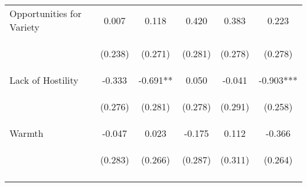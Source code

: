 \begin{tabular}{lccccc}
\noalign{\smallskip}Opportunities for Variety & 0.007 & 0.118 & 0.420 & 0.383 & 0.223\\
 & \begin{footnotesize}(0.238)\end{footnotesize} & \begin{footnotesize}(0.271)\end{footnotesize} & \begin{footnotesize}(0.281)\end{footnotesize} & \begin{footnotesize}(0.278)\end{footnotesize} & \begin{footnotesize}(0.278)\end{footnotesize}\\
\noalign{\smallskip}Lack of Hostility & -0.333 & -0.691** & 0.050 & -0.041 & -0.903***\\
 & \begin{footnotesize}(0.276)\end{footnotesize} & \begin{footnotesize}(0.281)\end{footnotesize} & \begin{footnotesize}(0.278)\end{footnotesize} & \begin{footnotesize}(0.291)\end{footnotesize} & \begin{footnotesize}(0.258)\end{footnotesize}\\
\noalign{\smallskip}Warmth & -0.047 & 0.023 & -0.175 & 0.112 & -0.366\\
 & \begin{footnotesize}(0.283)\end{footnotesize} & \begin{footnotesize}(0.266)\end{footnotesize} & \begin{footnotesize}(0.287)\end{footnotesize} & \begin{footnotesize}(0.311)\end{footnotesize} & \begin{footnotesize}(0.264)\end{footnotesize}\\
\noalign{\smallskip}\hline\end{tabular}\\
